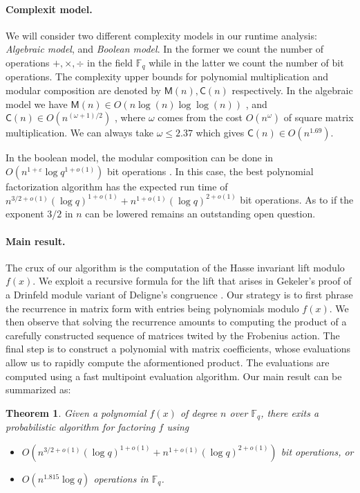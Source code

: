 \documentclass{article}
\theoremstyle{plain}
\newtheorem{theorem}{Theorem}
\theoremstyle{definition}
\def\F{\ensuremath{\mathbb{F}}}
\def\MM{\ensuremath{\mathsf{M}}}
\def\CC{\ensuremath{\mathsf{C}}}
\begin{document}
\paragraph{Complexit model.}
We will consider two different complexity models in our runtime analysis: \textit{Algebraic 
model}, and \textit{Boolean model}. In the former we count the number of operations $+, \times, 
\div$ in the field $\F_q$ while in the latter we count the number of bit operations. The complexity 
upper bounds for polynomial multiplication and modular composition are denoted by $\MM(n), \CC(n)$ 
respectively. In the algebraic model we have $\MM(n) \in O(n\log(n)\log\log(n))$
\cite{Schonhage1971}, and $\CC(n) \in O(n^{(\omega+1)/2})$ \cite{BrKu78}, where $\omega$ comes 
from the cost $O(n^\omega)$ of square matrix multiplication. We can always take $\omega \le 2.37$ 
\cite{CoWi90} which gives $\CC(n) \in O(n^{1.69})$.

In the boolean model, the modular composition can be done in $O(n^{1 + \varepsilon}\log q^{1 + 
o(1)})$ bit operations \cite{ku}. In this case, the best polynomial factorization algorithm has the 
expected run time of $n^{3/2+o(1)} (\log q)^{1+o(1)}+n^{1+o(1)} (\log q)^{2+o(1)}$ bit operations. 
As to if the exponent $3/2$ in $n$ can be lowered remains an outstanding open question.


\paragraph{Main result.}
The crux of our algorithm is the computation of the Hasse invariant lift modulo $f(x)$. We exploit 
a recursive formula for the lift that arises in Gekeler's proof of a Drinfeld module variant of 
Deligne's congruence \cite{gek}. Our strategy is to first phrase the recurrence in matrix form with 
entries being polynomials modulo $f(x)$. We then observe that solving the recurrence amounts to 
computing the product of a carefully constructed sequence of matrices twited by the Frobenius 
action. The final step is to construct a polynomial with matrix coefficients, whose evaluations 
allow us to rapidly compute the aformentioned product. The evaluations are computed using a fast 
multipoint evaluation algorithm. Our main result can be summarized as:

\begin{theorem}
	\label{theorem:main}
	Given a polynomial $f(x)$ of degree $n$ over $\F_q$, there exits a probabilistic algorithm for 
	factoring $f$ using
	\begin{itemize}
		\item $O(n^{3/2+o(1)} (\log q)^{1+o(1)} + n^{1+o(1)} (\log q)^{2+o(1)})$ bit operations, or
		\item $O(n^{1.815}\log q)$ operations in $\F_q$.
	\end{itemize}
\end{theorem}
\end{document}

